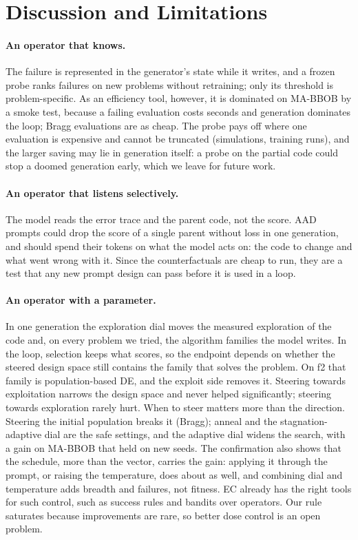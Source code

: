 \section{Discussion and Limitations}\label{sec:discussion}

\paragraph{An operator that knows.}
The failure is represented in the generator's state while it writes,
and a frozen probe ranks failures on new problems without retraining;
only its threshold is problem-specific. As an efficiency tool, however,
it is dominated on MA-BBOB by a smoke test, because a failing
evaluation costs seconds and generation dominates the loop; Bragg
evaluations are as cheap. The probe
pays off where one evaluation is expensive and cannot be truncated
(simulations, training runs), and the larger saving may lie in
generation itself: a probe on the partial code could stop a doomed
generation early, which we leave for future work.

\paragraph{An operator that listens selectively.}
The model reads the error trace and the parent code, not the score. AAD
prompts could drop the score of a single parent without loss in one
generation,
and should spend their tokens on what the model acts on: the code to
change and what went wrong with it. Since the counterfactuals are
cheap to run, they are a test that any new prompt design can pass
before it is used in a loop.

\paragraph{An operator with a parameter.}
In one generation the exploration dial moves the measured exploration
of the code and, on every problem we tried, the algorithm families the
model writes. In the loop, selection keeps what scores, so the endpoint
depends on whether the steered design space still contains the family
that solves the problem. On f2 that family is population-based DE, and
the exploit side removes it. Steering towards exploitation narrows the
design space and never helped significantly; steering towards
exploration rarely hurt. When to steer matters more than the direction.
Steering the initial population breaks it (Bragg); anneal and the
stagnation-adaptive dial are the safe settings, and the adaptive dial
widens the search, with a gain on MA-BBOB that held on new seeds. The confirmation also shows that the schedule, more
than the vector, carries the gain: applying it through the prompt, or
raising the temperature, does about as well, and combining dial and
temperature adds breadth and failures, not fitness. EC
already has the right tools for such control, such as success rules
and bandits over operators. Our rule saturates because improvements are
rare, so better dose control is an open problem.

